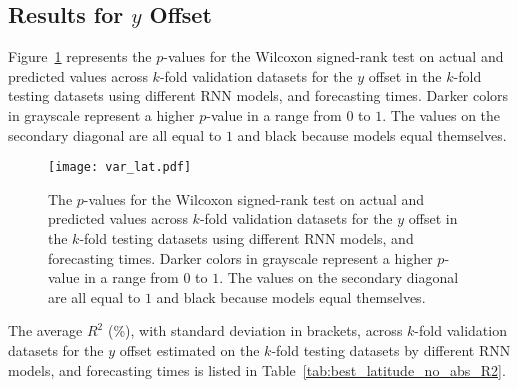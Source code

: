 \subsection{Results for $y$ Offset}

Figure~\ref{fig:var_lat} represents the $p$-values for the Wilcoxon signed-rank test on actual and predicted values across $k$-fold validation datasets for the $y$ offset in the $k$-fold testing datasets using different RNN models, and forecasting times. Darker colors in grayscale represent a higher $p$-value in a range from $0$ to $1$. The values on the secondary diagonal are all equal to $1$ and black because models equal themselves.

\begin{figure}[!ht]
	\centering
	\texttt{[image: var\_lat.pdf]}
	\caption{The $p$-values for the Wilcoxon signed-rank test on actual and predicted values across $k$-fold validation datasets for the $y$ offset in the $k$-fold testing datasets using different RNN models, and forecasting times. Darker colors in grayscale represent a higher $p$-value in a range from $0$ to $1$. The values on the secondary diagonal are all equal to $1$ and black because models equal themselves.}
	\label{fig:var_lat}
\end{figure}

The average $R^{2}$ (\%), with standard deviation in brackets, across $k$-fold validation datasets for the $y$ offset estimated on the $k$-fold testing datasets by different RNN models, and forecasting times is listed in Table~\ref{tab:best_latitude_no_abs_R2}.

